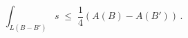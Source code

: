 \begin{equation}
\int_{L(B-B')} s \; \leq \; \frac{1}{4} \left(A(B) - A(B')\right)\, .
\label{eqclassbound}
\end{equation}

